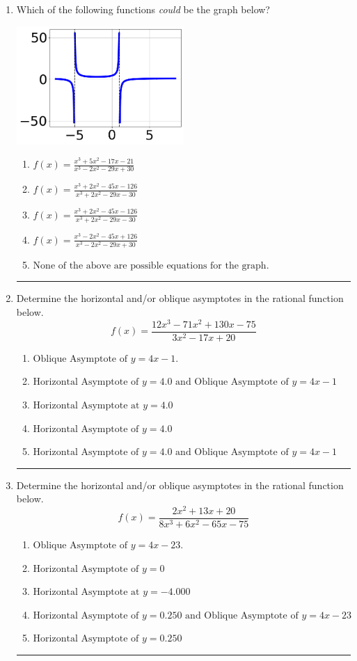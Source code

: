 \documentclass[14pt]{extbook}
\newcommand{\litem}[1]{\item#1\hspace*{-1cm}\rule{\textwidth}{0.4pt}}
\begin{document}
\begin{enumerate}
{\begin{enumerate}[label=\Alph*.]
\end{enumerate} }
\litem{
Which of the following functions \textit{could} be the graph below?
\begin{center}
    \includegraphics[width=0.5\textwidth]{../Figures/identifyGraphOfRationalFunctionA.png}
\end{center}
\begin{enumerate}[label=\Alph*.]
\item \( f(x)=\frac{x^{3} +5 x^{2} -17 x -21}{x^{3} -2 x^{2} -29 x + 30} \)
\item \( f(x)=\frac{x^{3} +2 x^{2} -45 x -126}{x^{3} +2 x^{2} -29 x -30} \)
\item \( f(x)=\frac{x^{3} +2 x^{2} -45 x -126}{x^{3} +2 x^{2} -29 x -30} \)
\item \( f(x)=\frac{x^{3} -2 x^{2} -45 x + 126}{x^{3} -2 x^{2} -29 x + 30} \)
\item \( \text{None of the above are possible equations for the graph.} \)

\end{enumerate} }
\litem{
Determine the horizontal and/or oblique asymptotes in the rational function below.\[ f(x) = \frac{12x^{3} -71 x^{2} +130 x -75}{3x^{2} -17 x + 20} \]\begin{enumerate}[label=\Alph*.]
\item \( \text{Oblique Asymptote of } y = 4x -1. \)
\item \( \text{Horizontal Asymptote of } y = 4.0 \text{ and Oblique Asymptote of } y = 4x -1 \)
\item \( \text{Horizontal Asymptote at } y = 4.0 \)
\item \( \text{Horizontal Asymptote of } y = 4.0  \)
\item \( \text{Horizontal Asymptote of } y = 4.0 \text{ and Oblique Asymptote of } y = 4x -1 \)

\end{enumerate} }
\litem{
Determine the horizontal and/or oblique asymptotes in the rational function below.\[ f(x) = \frac{2x^{2} +13 x + 20}{8x^{3} +6 x^{2} -65 x -75} \]\begin{enumerate}[label=\Alph*.]
\item \( \text{Oblique Asymptote of } y = 4x -23. \)
\item \( \text{Horizontal Asymptote of } y = 0 \)
\item \( \text{Horizontal Asymptote at } y = -4.000 \)
\item \( \text{Horizontal Asymptote of } y = 0.250 \text{ and Oblique Asymptote of } y = 4x -23 \)
\item \( \text{Horizontal Asymptote of } y = 0.250  \)


\end{enumerate}}
\end{enumerate}
\end{document}
